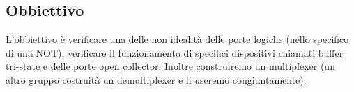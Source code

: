 \subsection{Obbiettivo}

L'obbiettivo è verificare una delle non idealità delle porte logiche (nello specifico di una NOT),
verificare il funzionamento di specifici dispositivi chiamati buffer tri-state e delle porte open collector. Inoltre
construiremo un multiplexer (un altro gruppo costruità un demultiplexer e li useremo congiuntamente).
